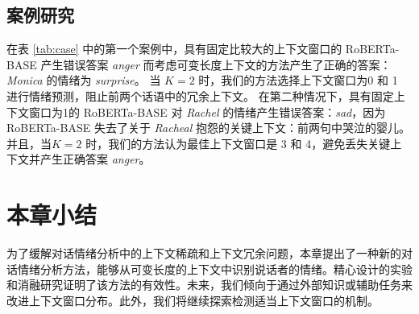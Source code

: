 \subsection{案例研究}
在表 \ref{tab:case} 中的第一个案例中，具有固定比较大的上下文窗口的 RoBERTa-BASE 产生错误答案 \textit{anger} 而考虑可变长度上下文的方法产生了正确的答案：\textit{Monica} 的情绪为 \textit{surprise}。 当 $K=2$ 时，我们的方法选择上下文窗口为0 和 1 进行情绪预测，阻止前两个话语中的冗余上下文。 在第二种情况下，具有固定上下文窗口为1的 RoBERTa-BASE 对 \textit{Rachel} 的情绪产生错误答案：\textit{sad}，因为 RoBERTa-BASE 失去了关于 \textit{Racheal} 抱怨的关键上下文：前两句中哭泣的婴儿。并且，当$K=2$ 时，我们的方法认为最佳上下文窗口是 3 和 4，避免丢失关键上下文并产生正确答案 \textit{anger}。
\begin{table}[ht!]
\centering
\caption{来自 EmoryNLP 的测试实例。 比较了RoBERTa-BASE (RoB) 与新方法的结果。}
\label{tab:case}
\end{table}


\section{本章小结}\label{sec:erc_conclusion}
为了缓解对话情绪分析中的上下文稀疏和上下文冗余问题，本章提出了一种新的对话情绪分析方法，能够从可变长度的上下文中识别说话者的情绪。精心设计的实验和消融研究证明了该方法的有效性。未来，我们倾向于通过外部知识或辅助任务来改进上下文窗口分布。此外，我们将继续探索检测适当上下文窗口的机制。
